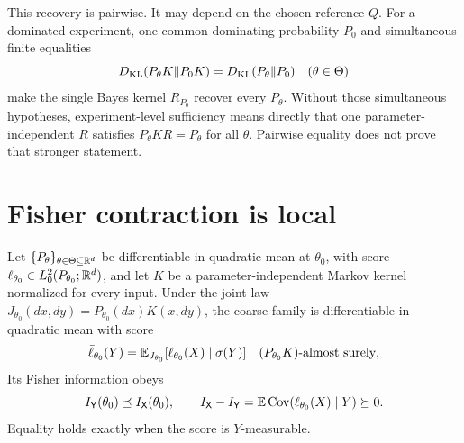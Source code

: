 This recovery is pairwise. It may depend on the chosen reference \(Q\).
For a dominated experiment, one common dominating probability \(P_0\) and
simultaneous finite equalities
\[
D_{\mathrm{KL}}(P_\theta K\Vert P_0K)=D_{\mathrm{KL}}(P_\theta\Vert P_0)
\quad(\theta\in\Theta)
\]
make the single Bayes kernel \(R_{P_0}\) recover every \(P_\theta\).
Without those simultaneous hypotheses, experiment-level sufficiency means
directly that one parameter-independent \(R\) satisfies
\(P_\theta KR=P_\theta\) for all \(\theta\). Pairwise equality does not
prove that stronger statement. 

\section{Fisher contraction is local}
\label{sec:cg-fisher-contraction}

Let \(\{P_\theta\}_{\theta\in\Theta\subseteq\mathbb R^d}\) be differentiable in
quadratic mean at \(\theta_0\), with score
\(\ell_{\theta_0}\in L^2_0(P_{\theta_0};\mathbb R^d)\), and let \(K\) be a
parameter-independent Markov kernel normalized for every input. Under the
joint law \(J_{\theta_0}(dx,dy)=P_{\theta_0}(dx)K(x,dy)\), the coarse family
is differentiable in quadratic mean with score
\begin{equation}
\bar\ell_{\theta_0}(Y)
=\mathbb E_{J_{\theta_0}}[\ell_{\theta_0}(X)\mid\sigma(Y)]
\quad (P_{\theta_0}K)\text{-almost surely},
\label{eq:cg-score-projection}
\end{equation}
Its Fisher information obeys
\begin{equation}
I_{\mathsf Y}(\theta_0)\preceq I_{\mathsf X}(\theta_0),\qquad
I_{\mathsf X}-I_{\mathsf Y}
=\mathbb E\operatorname{Cov}(\ell_{\theta_0}(X)\mid Y)\succeq0.
\label{eq:cg-fisher-loss}
\end{equation}
Equality holds exactly when the score is \(Y\)-measurable.

